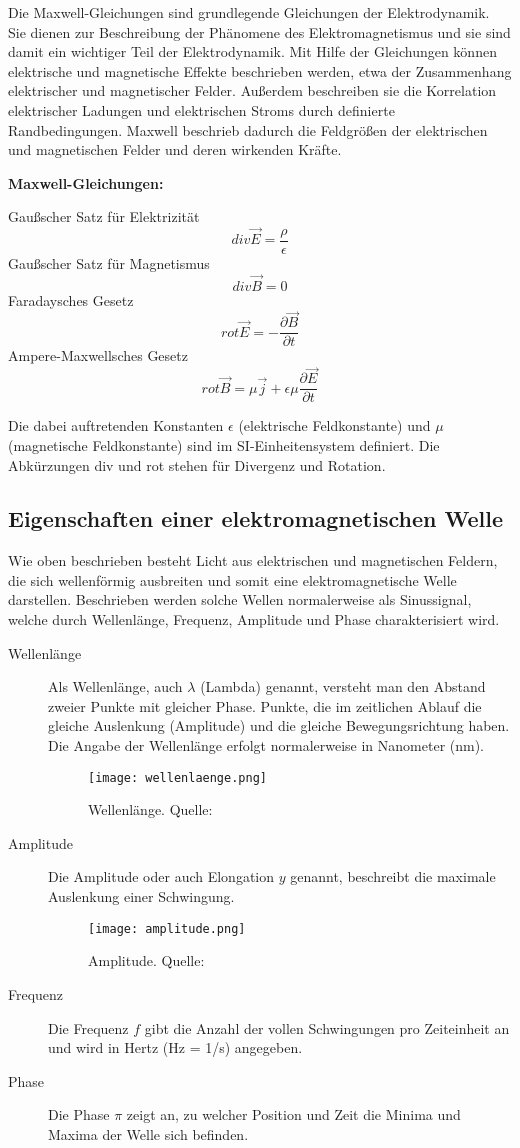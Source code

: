 Die Maxwell-Gleichungen sind grundlegende Gleichungen der Elektrodynamik. Sie dienen zur Beschreibung der Phänomene des Elektromagnetismus und sie sind damit ein wichtiger Teil der Elektrodynamik. Mit Hilfe der Gleichungen können elektrische und magnetische Effekte beschrieben werden, etwa der Zusammenhang elektrischer und magnetischer Felder. Außerdem beschreiben sie die Korrelation elektrischer Ladungen und elektrischen Stroms durch definierte Randbedingungen. Maxwell beschrieb dadurch die Feldgrößen der elektrischen und magnetischen Felder und deren wirkenden Kräfte. 

\textbf{Maxwell-Gleichungen:}

Gaußscher Satz für Elektrizität		\[div \vec{E} = \frac{\rho}{\epsilon}\]		
Gaußscher Satz für Magnetismus 		\[div \vec{B} = 0\]
Faradaysches Gesetz					\[rot \vec{E} = -\frac{\partial\vec{B}}{\partial t}\]
Ampere-Maxwellsches Gesetz			\[rot \vec{B} = \mu\vec{j}+\epsilon\mu\frac{\partial\vec{E}}{\partial t}\]
\cite{halliday2017halliday}

Die dabei auftretenden Konstanten $\epsilon$ (elektrische Feldkonstante) und $\mu$ (magnetische Feldkonstante) sind im SI-Einheitensystem definiert. Die Abkürzungen div und rot stehen für Divergenz und Rotation. 

\subsection{Eigenschaften einer elektromagnetischen Welle}
Wie oben beschrieben besteht Licht aus elektrischen und magnetischen Feldern, die sich wellenförmig ausbreiten und somit eine elektromagnetische Welle darstellen. Beschrieben werden solche Wellen normalerweise als Sinussignal, welche durch Wellenlänge, Frequenz, Amplitude und Phase charakterisiert wird.
\begin{description}
	\item[Wellenlänge] Als Wellenlänge, auch $\lambda$ (Lambda) genannt, versteht man den Abstand zweier Punkte mit gleicher Phase. Punkte, die im zeitlichen Ablauf die gleiche Auslenkung (Amplitude) und die gleiche Bewegungsrichtung haben. Die Angabe der Wellenlänge erfolgt normalerweise in Nanometer (nm).
	\begin{figure}[ht]
		\centering
		\texttt{[image: wellenlaenge.png]}
		\caption[Wellenlänge]{Wellenlänge. Quelle: \cite{uniwien:2018}}
		\label{Wellenlänge}
	\end{figure}
	\item[Amplitude] Die Amplitude oder auch Elongation $y$ genannt, beschreibt die maximale Auslenkung einer Schwingung.
		\begin{figure}[ht]
		\centering
		\texttt{[image: amplitude.png]}
		\caption[Amplitude]{Amplitude. Quelle: \cite{uniwien:2018}}
			\label{Amplitude}
		\end{figure}
	\item[Frequenz]Die Frequenz $f$ gibt die Anzahl der vollen Schwingungen  pro Zeiteinheit an und wird in Hertz (Hz = 1/s) angegeben.
	\item[Phase] Die Phase $\pi$ zeigt an, zu welcher Position und Zeit die Minima und Maxima der Welle sich befinden.
\end{description}

